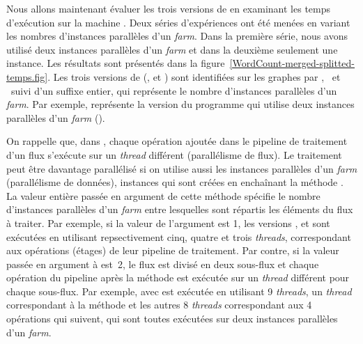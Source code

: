 Nous allons maintenant \'evaluer les trois versions de  en examinant les temps d'ex\'ecution sur la machine . Deux s\'eries d'exp\'eriences ont \'et\'e men\'ees en variant les nombres d'instances parall\`eles d'un \emph{farm}. Dans la premi\`ere s\'erie, nous avons utilis\'e deux instances parall\`eles d'un \emph{farm} et dans la deuxi\`eme seulement une instance.  Les r\'esultats sont présentés dans la figure~\ref{WordCount-merged-splitted-temps.fig}. Les trois versions de  (,  et ) sont identifiées sur les graphes par \ppffs, \ppff\ et \ppffm\ suivi d'un suffixe entier, qui repr\'esente le nombre d'instances parall\`eles d'un \emph{farm}. Par exemple, \ppffs{} repr\'esente la version du programme  qui utilise deux instances parall\`eles d'un \emph{farm} ().

On rappelle que, dans , chaque op\'eration ajout\'ee dans le pipeline de traitement d'un flux s'ex\'ecute sur un \emph{thread} diff\'erent (parallélisme de flux). Le traitement peut \^etre davantage parall\'elis\'e si on utilise aussi les instances parall\`eles d'un \emph{farm} (parallélisme de données), instances qui sont cr\'e\'ees en encha\^inant la m\'ethode . La valeur enti\`ere pass\'ee en argument de cette m\'ethode sp\'ecifie le nombre d'instances parall\`eles d'un \emph{farm} entre lesquelles sont r\'epartis les \'el\'ements du flux \`a traiter. Par exemple, si la valeur de l'argument est 1, les versions ,  et  sont ex\'ecut\'ees en utilisant repsectivement cinq, quatre et trois \emph{threads}, correspondant aux op\'erations (étages) de leur pipeline de traitement. Par contre, si la valeur pass\'ee en argument \`a   est~2, le flux est divis\'e en deux sous-flux et chaque op\'eration du pipeline après la m\'ethode  est ex\'ecut\'ee sur un \emph{thread} diff\'erent pour chaque sous-flux. Par exemple,  avec  est ex\'ecut\'ee en utilisant 9 \emph{threads}, un \emph{thread} correspondant \`a la m\'ethode  et les autres 8 \emph{threads} correspondant aux 4 op\'erations qui suivent, qui sont toutes ex\'ecut\'ees sur deux instances parall\`eles d'un \emph{farm}.

